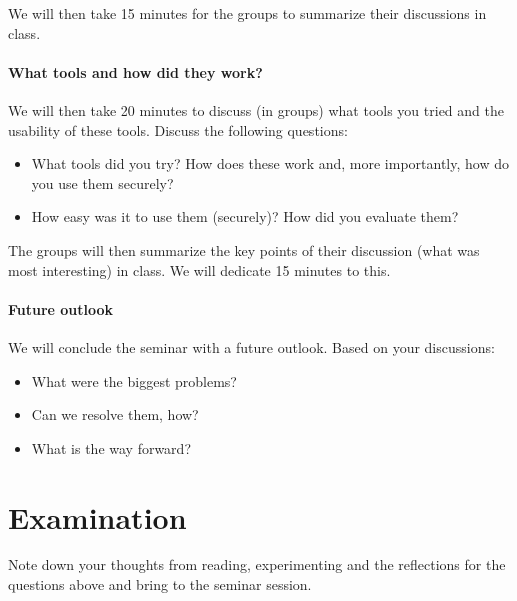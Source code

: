 We will then take 15 minutes for the groups to summarize their discussions in 
class.

\paragraph{What tools and how did they work?}

We will then take 20 minutes to discuss (in groups) what tools you tried and 
the usability of these tools.
Discuss the following questions:
\begin{itemize}
  \item What tools did you try?
    How does these work and, more importantly, how do you use them securely?

  \item How easy was it to use them (securely)?
    How did you evaluate them?
\end{itemize}

The groups will then summarize the key points of their discussion (\eg what was 
most interesting) in class.
We will dedicate 15 minutes to this.

\paragraph{Future outlook}

We will conclude the seminar with a future outlook.
Based on your discussions:
\begin{itemize}
  \item What were the biggest problems?
  \item Can we resolve them, how?
  \item What is the way forward?
\end{itemize}


\section{Examination}

Note down your thoughts from reading, experimenting and the reflections for the 
questions above and bring to the seminar session.


\printbibliography
